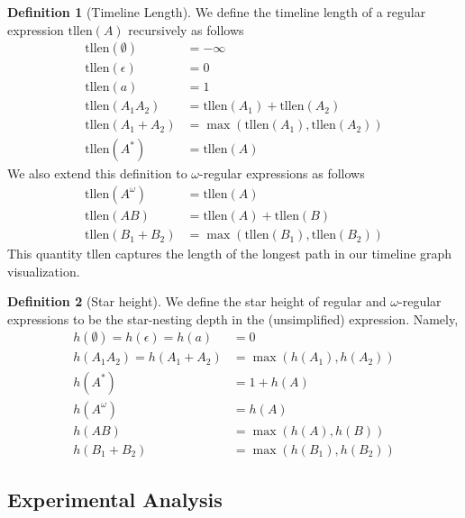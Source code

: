 \documentclass[conference]{IEEEtran}
\theoremstyle{definition}
\newtheorem{definition}{Definition}[section]
\theoremstyle{remark}
\newcommand{\tllen}{\text{tllen}}
\begin{document}
\begin{definition}[Timeline Length]
    We define the timeline length of a regular expression $\tllen(A)$ recursively as follows
    \begin{align*}
        \tllen(\emptyset)   &= -\infty\\
        \tllen(\epsilon)        &= 0\\
        \tllen(a)           &= 1\\
        \tllen(A_1 A_2)     &= \tllen(A_1) + \tllen(A_2)\\
        \tllen(A_1 + A_2)   &= \max(\tllen(A_1), \tllen(A_2))\\
        \tllen(A^*)         &= \tllen(A)
    \end{align*}
    We also extend this definition to $\omega$-regular expressions as follows
    \begin{align*}
        \tllen(A^\omega)    &= \tllen(A)\\
        \tllen(AB)          &= \tllen(A) + \tllen(B)\\
        \tllen(B_1 + B_2)   &= \max(\tllen(B_1), \tllen(B_2))
    \end{align*}
    This quantity $\tllen$ captures the length of the longest path in our timeline graph visualization.
\end{definition}

\begin{definition}[Star height]
    We define the star height of regular and $\omega$-regular expressions to be the star-nesting depth in the (unsimplified) expression. Namely,
    \begin{align*}
        h(\emptyset) = h(\epsilon) = h(a) &= 0\\
        h(A_1 A_2) = h(A_1 + A_2) &= \max(h(A_1), h(A_2))\\
        h(A^*) &= 1 + h(A)\\
        h(A^\omega) &= h(A)\\
        h(A B) &= \max(h(A), h(B))\\
        h(B_1 + B_2) &= \max(h(B_1), h(B_2))
    \end{align*}

\end{definition}

\subsection{Experimental Analysis} %
\end{document}
